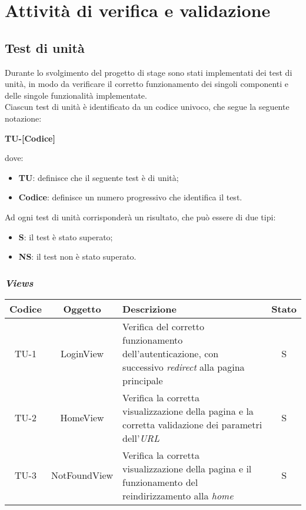 \chapter{Attività di verifica e validazione}\label{cap:verifica-validazione}


\section{Test di unità}
Durante lo svolgimento del progetto di stage sono stati implementati dei test di unità, in modo da verificare il corretto funzionamento
dei singoli componenti e delle singole funzionalità implementate.\\
Ciascun test di unità è identificato da un codice univoco, che segue la seguente notazione:
\begin{center}
  \textbf{TU-[Codice]}
\end{center}
dove:
\begin{itemize}
  \item \textbf{TU}: definisce che il seguente test è di unità;
  \item \textbf{Codice}: definisce un numero progressivo che identifica il test.
\end{itemize}
Ad ogni test di unità corrisponderà un risultato, che può essere di due tipi:
\begin{itemize}
  \item \textbf{S}: il test è stato superato;
  \item \textbf{NS}: il test non è stato superato.
\end{itemize}

\clearpage
\subsection*{\emph{Views}}

\begin{center}
  \label{tab:test-unita-views}
  \begin{longtable}{|c|c|p{}|c|}
  \hline
  \textbf{Codice} & \textbf{Oggetto} & \textbf{Descrizione} & \textbf{Stato}\\
  \hline
  TU-1 &LoginView &Verifica del corretto funzionamento dell'autenticazione, con successivo \textit{redirect} alla pagina principale &S \\
  \hline
  TU-2 &HomeView &Verifica la corretta visualizzazione della pagina e la corretta validazione dei parametri dell'\textit{URL} &S \\
  \hline
  TU-3 &NotFoundView &Verifica la corretta visualizzazione della pagina e il funzionamento del reindirizzamento alla \textit{home} &S \\
  \hline
\end{longtable}
\end{center}

